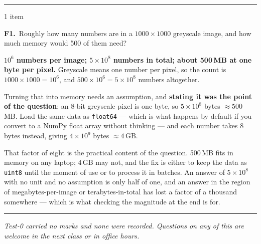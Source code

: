 \documentclass[10pt,a4paper]{article}
\newcommand{\parthead}[2]{\vspace{2pt}\noindent\rule{\linewidth}{0.4pt}\par\vspace{2pt}%
  \noindent{\bfseries Block #1}\hfill{\small #2}\par\vspace{1pt}}
\newcommand{\sol}[1]{\textbf{#1}}
\begin{document}
\parthead{F --- Estimation}{1 item}

\textbf{F1.}\ Roughly how many numbers are in a $1000 \times 1000$ greyscale image, and how much
memory would 500 of them need?

\vspace{2pt}

\sol{$10^6$ numbers per image; $5 \times 10^8$ numbers in total; about \textbf{500\,MB} at one byte per
pixel.} Greyscale means one number per pixel, so the count is $1000 \times 1000 = 10^{6}$, and
$500 \times 10^{6} = 5 \times 10^{8}$ numbers altogether.

Turning that into memory needs an assumption, and \textbf{stating it was the point of the question}:
an 8-bit greyscale pixel is one byte, so $5 \times 10^{8}$ bytes $\approx 500$\,MB. Load the same data
as \texttt{float64} --- which is what happens by default if you convert to a NumPy float array without
thinking --- and each number takes 8 bytes instead, giving $4 \times 10^{9}$ bytes $\approx 4$\,GB.

That factor of eight is the practical content of the question. 500\,MB fits in memory on any laptop;
4\,GB may not, and the fix is either to keep the data as \texttt{uint8} until the moment of use or to
process it in batches. An answer of $5 \times 10^{8}$ with no unit and no assumption is only half of
one, and an answer in the region of megabytes-per-image or terabytes-in-total has lost a factor of a
thousand somewhere --- which is what checking the magnitude at the end is for.

\vspace{8pt}
\hrule
\vspace{4pt}

{\footnotesize\itshape Test-0 carried no marks and none were recorded. Questions on any of this are
welcome in the next class or in office hours.}
\end{document}
